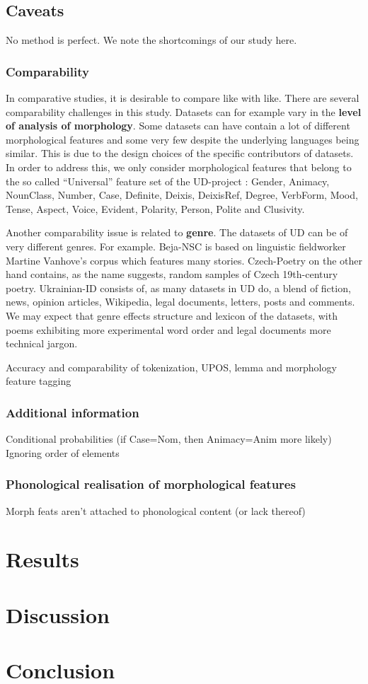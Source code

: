\documentclass[USenglish]{article}
\begin{document}
\subsection{Caveats}
No method is perfect. We note the shortcomings of our study here. 

\subsubsection{Comparability}
In comparative studies, it is desirable to compare like with like. There are several comparability challenges in this study. 
Datasets can for example vary in the \textbf{level of analysis of morphology}. 
Some datasets can have contain a lot of different morphological features and some very few despite the underlying languages being similar. 
This is due to the design choices of the specific contributors of datasets. 
In order to address this, we only consider morphological features that belong to the so called ``Universal'' feature set of the UD-project \citep{ud_2_feat_website}: Gender, Animacy, NounClass, Number, Case, Definite, Deixis, DeixisRef, Degree, VerbForm, Mood, Tense, Aspect, Voice, Evident, Polarity, Person, Polite and Clusivity.

Another comparability issue is related to \textbf{genre}. The datasets of UD can be of very different genres. For example. Beja-NSC is based on linguistic fieldworker Martine Vanhove's corpus which features many stories. Czech-Poetry on the other hand contains, as the name suggests, random samples of Czech 19th-century poetry. Ukrainian-ID consists of, as many datasets in UD do, a blend of fiction, news, opinion articles, Wikipedia, legal documents, letters, posts and comments. We may expect that genre effects structure and lexicon of the datasets, with poems exhibiting more experimental word order and legal documents more technical jargon. 



Accuracy and comparability of tokenization, UPOS, lemma and morphology feature tagging

\subsubsection{Additional information}
Conditional probabilities (if Case=Nom, then Animacy=Anim more likely)
Ignoring order of elements

\subsubsection{Phonological realisation of morphological features}
Morph feats aren't attached to phonological content (or lack thereof)




\section{Results}

\section{Discussion}

\section{Conclusion}





	
\end{document}

